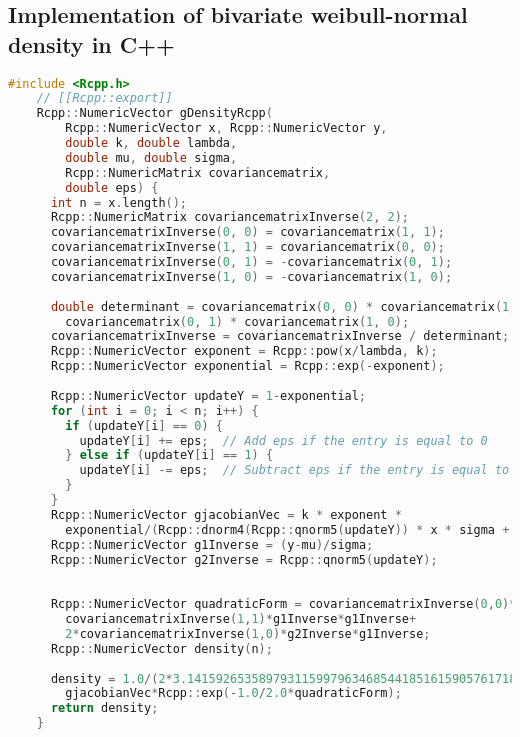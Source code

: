 \subsection{Implementation of bivariate weibull-normal density in C++}\label{densityImplementation}
\begin{lstlisting}[language=C++]
    #include <Rcpp.h>
    // [[Rcpp::export]]
    Rcpp::NumericVector gDensityRcpp(
        Rcpp::NumericVector x, Rcpp::NumericVector y,
        double k, double lambda,
        double mu, double sigma,
        Rcpp::NumericMatrix covariancematrix,
        double eps) {
      int n = x.length();
      Rcpp::NumericMatrix covariancematrixInverse(2, 2);
      covariancematrixInverse(0, 0) = covariancematrix(1, 1);
      covariancematrixInverse(1, 1) = covariancematrix(0, 0);
      covariancematrixInverse(0, 1) = -covariancematrix(0, 1);
      covariancematrixInverse(1, 0) = -covariancematrix(1, 0);
    
      double determinant = covariancematrix(0, 0) * covariancematrix(1, 1) -
        covariancematrix(0, 1) * covariancematrix(1, 0);
      covariancematrixInverse = covariancematrixInverse / determinant;
      Rcpp::NumericVector exponent = Rcpp::pow(x/lambda, k);
      Rcpp::NumericVector exponential = Rcpp::exp(-exponent);
    
      Rcpp::NumericVector updateY = 1-exponential;
      for (int i = 0; i < n; i++) {
        if (updateY[i] == 0) {
          updateY[i] += eps;  // Add eps if the entry is equal to 0
        } else if (updateY[i] == 1) {
          updateY[i] -= eps;  // Subtract eps if the entry is equal to 1
        }
      }
      Rcpp::NumericVector gjacobianVec = k * exponent *
        exponential/(Rcpp::dnorm4(Rcpp::qnorm5(updateY)) * x * sigma + eps);
      Rcpp::NumericVector g1Inverse = (y-mu)/sigma;
      Rcpp::NumericVector g2Inverse = Rcpp::qnorm5(updateY);
    
    
      Rcpp::NumericVector quadraticForm = covariancematrixInverse(0,0)*g2Inverse*g2Inverse + 
        covariancematrixInverse(1,1)*g1Inverse*g1Inverse+
        2*covariancematrixInverse(1,0)*g2Inverse*g1Inverse;
      Rcpp::NumericVector density(n);
      
      density = 1.0/(2*3.141592653589793115997963468544185161590576171875*sqrt(determinant))*
        gjacobianVec*Rcpp::exp(-1.0/2.0*quadraticForm);
      return density;
    }
\end{lstlisting}
\newpage

